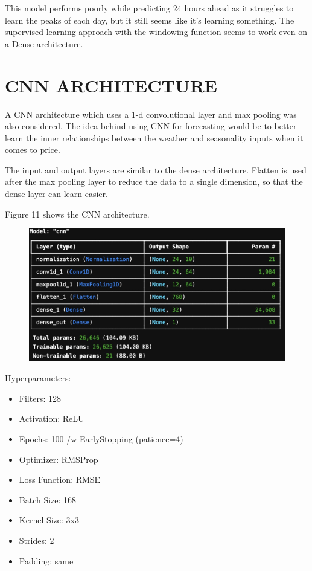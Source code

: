 \documentclass[9pt,a4paper,twoside]{rho}
\begin{document}
\noindent This model performs poorly while predicting 24 hours ahead as it struggles to learn the peaks of each day, but it still seems like it's learning something. The supervised learning approach with the windowing function seems to work even on a Dense architecture.


\section*{CNN ARCHITECTURE}

A CNN architecture which uses a 1-d convolutional layer and max pooling was also considered. The idea behind using CNN for forecasting would be to better learn the inner relationships between the weather and seasonality inputs when it comes to price.

\noindent The input and output layers are similar to the dense architecture. Flatten is used after the max pooling layer to reduce the data to a single dimension, so that the dense layer can learn easier.

\noindent Figure 11 shows the CNN architecture.
\begin{figure}[H]
	\centering
	\includegraphics[width=0.8\columnwidth]{Figures/CNN_Architecture.png}
\end{figure}

\noindent Hyperparameters:
\begin{itemize}
	\item Filters: 128
	\item Activation: ReLU
	\item Epochs: 100 /w EarlyStopping (patience=4)
	\item Optimizer: RMSProp
	\item Loss Function: RMSE
	\item Batch Size: 168
	\item Kernel Size: 3x3
	\item Strides: 2
	\item Padding: same
\end{itemize}
\end{document}
